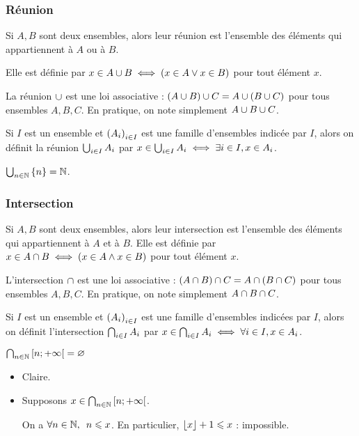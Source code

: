 \subsubsection{Réunion}

Si \(A,B\) sont deux ensembles, alors leur réunion est l'ensemble des éléments qui appartiennent à \(A\) ou à \(B\).

Elle est définie par \(x\in A\cup B\iff\left(x\in A\lor x\in B\right)\) pour tout élément \(x\).

La réunion \(\cup\) est une loi associative : \(\left(A\cup B\right)\cup C=A\cup\left(B\cup C\right)\) pour tous ensembles \(A,B,C\). En pratique, on note simplement \(A\cup B\cup C\).

Si \(I\) est un ensemble et \(\left(A_i\right)_{i\in I}\) est une famille d'ensembles indicée par \(I\), alors on définit la réunion \(\bigcup_{i\in I}A_i\) par \(x\in\bigcup_{i\in I}A_i\iff\exists i\in I,x\in A_i\).

\begin{ex}
\(\bigcup_{n\in\mathbb{N}}\left\lbrace n\right\rbrace=\mathbb{N}\).
\end{ex}

\subsubsection{Intersection}

Si \(A,B\) sont deux ensembles, alors leur intersection est l'ensemble des éléments qui appartiennent à \(A\) et à \(B\). Elle est définie par \(x\in A\cap B\iff\left(x\in A\land x\in B\right)\) pour tout élément \(x\).

L'intersection \(\cap\) est une loi associative : \(\left(A\cap B\right)\cap C=A\cap\left(B\cap C\right)\) pour tous ensembles \(A,B,C\). En pratique, on note simplement \(A\cap B\cap C\).

Si \(I\) est un ensemble et \(\left(A_i\right)_{i\in I}\) est une famille d'ensembles indicées par \(I\), alors on définit l'intersection \(\bigcap_{i\in I}A_i\) par \(x\in\bigcap_{i\in I}A_i\iff\forall i\in I,x\in A_i\).

\begin{ex}
\(\bigcap_{n\in\mathbb{N}}\left[n;+\infty\right[=\varnothing\)
\end{ex}

\begin{dem}
\begin{itemize}
\item[\increc] Claire.

\item[\incdir] Supposons \(x\in\bigcap_{n\in\mathbb{N}}\left[n;+\infty\right[\).

On a \(\quantifs{\forall n\in\N}n\leq x\). En particulier, \(\left\lfloor x\right\rfloor+1\leqslant x\) : impossible.
\end{itemize}
\end{dem}

